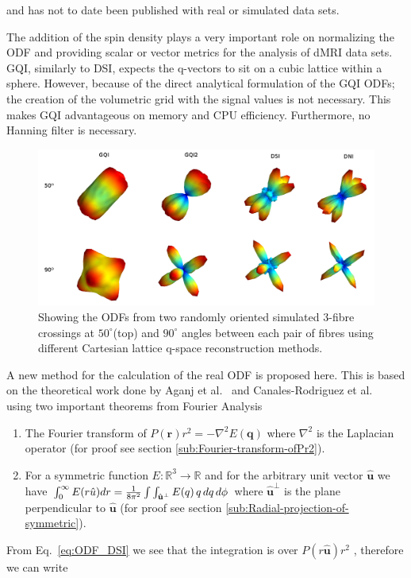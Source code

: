 \documentclass{bioinfo}
\begin{document}
\begin{flushleft}
and has not to date been published with real or simulated data sets.
\par\end{flushleft}

The addition of the spin density plays a very important role on normalizing
the ODF and providing scalar or vector metrics for the analysis of
dMRI data sets. GQI, similarly to DSI, expects the q-vectors to sit
on a cubic lattice within a sphere. However, because of the direct
analytical formulation of the GQI ODFs; the creation of the volumetric
grid with the signal values is not necessary. This makes GQI advantageous
on memory and CPU efficiency. Furthermore, no Hanning filter is necessary.

%
\begin{figure}
\begin{centering}
\includegraphics[scale=0.3]{figures/triple_crossing_gqi_gqi2_dsi_dni}
\par\end{centering}

\caption{Showing the ODFs from two randomly oriented simulated $3$-fibre crossings
at $50^{\circ}$(top) and $90^{\circ}$ angles between each pair of
fibres using different Cartesian lattice q-space reconstruction methods. }


\label{Flo:beautiful-triple-crossing}
\end{figure}


A new method for the calculation of the real ODF is proposed here.
This is based on the theoretical work done by Aganj et al.~\cite{aganj2010reconstruction}
and Canales-Rodriguez et al.~\cite{Canales-Rodriguez2009} using
two important theorems from Fourier Analysis
\begin{enumerate}
\item The Fourier transform of $P(\mathbf{r})r^{2}=-\nabla^{2}E(\mathbf{q})$
where $\nabla^{2}$ is the Laplacian operator (for proof see section
\ref{sub:Fourier-transform-ofPr2}).
\item For a symmetric function $E:\mathbb{R}^{3}\rightarrow\mathbb{R}$
and for the arbitrary unit vector $\hat{\mathbf{u}}$ we have $\intop_{0}^{\infty}E(r\hat{u})dr=\frac{1}{8\pi^{2}}\int\int_{\hat{\mathbf{u}}^{\perp}}E(q)\, q\, dq\, d\phi$
where $\hat{\mathbf{u}}^{\perp}$ is the plane perpendicular to $\hat{\mathbf{u}}$
(for proof see section \ref{sub:Radial-projection-of-symmetric}).
\end{enumerate}
From Eq.~\ref{eq:ODF_DSI} we see that the integration is over $P(r\hat{\mathbf{u}})r^{2}$
, therefore we can write
\end{document}
